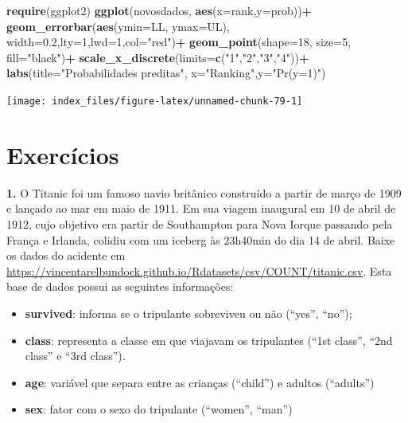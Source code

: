 \documentclass[12pt,brazil,oneside]{book}
\newenvironment{Shaded}{\begin{snugshade}}{\end{snugshade}}
\newcommand{\DataTypeTok}[1]{\textcolor[rgb]{0.13,0.29,0.53}{#1}}
\newcommand{\DecValTok}[1]{\textcolor[rgb]{0.00,0.00,0.81}{#1}}
\newcommand{\FloatTok}[1]{\textcolor[rgb]{0.00,0.00,0.81}{#1}}
\newcommand{\KeywordTok}[1]{\textcolor[rgb]{0.13,0.29,0.53}{\textbf{#1}}}
\newcommand{\NormalTok}[1]{#1}
\newcommand{\OperatorTok}[1]{\textcolor[rgb]{0.81,0.36,0.00}{\textbf{#1}}}
\newcommand{\StringTok}[1]{\textcolor[rgb]{0.31,0.60,0.02}{#1}}
\providecommand{\tightlist}{%
  \setlength{\itemsep}{0pt}\setlength{\parskip}{0pt}}
\begin{document}
\begin{Shaded}
\begin{Highlighting}[]
\KeywordTok{require}\NormalTok{(ggplot2)}
\KeywordTok{ggplot}\NormalTok{(novosdados, }\KeywordTok{aes}\NormalTok{(}\DataTypeTok{x=}\NormalTok{rank,}\DataTypeTok{y=}\NormalTok{prob))}\OperatorTok{+}
\StringTok{  }\KeywordTok{geom_errorbar}\NormalTok{(}\KeywordTok{aes}\NormalTok{(}\DataTypeTok{ymin=}\NormalTok{LL, }\DataTypeTok{ymax=}\NormalTok{UL), }\DataTypeTok{width=}\FloatTok{0.2}\NormalTok{,}\DataTypeTok{lty=}\DecValTok{1}\NormalTok{,}\DataTypeTok{lwd=}\DecValTok{1}\NormalTok{,}\DataTypeTok{col=}\StringTok{"red"}\NormalTok{)}\OperatorTok{+}
\StringTok{  }\KeywordTok{geom_point}\NormalTok{(}\DataTypeTok{shape=}\DecValTok{18}\NormalTok{, }\DataTypeTok{size=}\DecValTok{5}\NormalTok{, }\DataTypeTok{fill=}\StringTok{"black"}\NormalTok{)}\OperatorTok{+}
\StringTok{  }\KeywordTok{scale_x_discrete}\NormalTok{(}\DataTypeTok{limits=}\KeywordTok{c}\NormalTok{(}\StringTok{"1"}\NormalTok{,}\StringTok{"2"}\NormalTok{,}\StringTok{"3"}\NormalTok{,}\StringTok{"4"}\NormalTok{))}\OperatorTok{+}
\StringTok{  }\KeywordTok{labs}\NormalTok{(}\DataTypeTok{title=}\StringTok{"Probabilidades preditas"}\NormalTok{, }\DataTypeTok{x=}\StringTok{"Ranking"}\NormalTok{,}\DataTypeTok{y=}\StringTok{"Pr(y=1)"}\NormalTok{)}
\end{Highlighting}
\end{Shaded}

\begin{center}\texttt{[image: index\_files/figure-latex/unnamed-chunk-79-1]} \end{center}

\hypertarget{exercicios}{%
\section{Exercícios}\label{exercicios}}

\textbf{1.} O Titanic foi um famoso navio britânico construído a partir
de março de 1909 e lançado ao mar em maio de 1911. Em sua viagem
inaugural em 10 de abril de 1912, cujo objetivo era partir de
Southampton para Nova Iorque passando pela França e Irlanda, colidiu com
um iceberg às 23h40min do dia 14 de abril. Baixe os dados do acidente em
\url{https://vincentarelbundock.github.io/Rdatasets/csv/COUNT/titanic.csv}.
Esta base de dados possui as seguintes informações:

\begin{itemize}
\tightlist
\item
  \textbf{survived}: informa se o tripulante sobreviveu ou não (``yes'',
  ``no'');
\item
  \textbf{class}: representa a classe em que viajavam os tripulantes
  (``1st class'', ``2nd class'' e ``3rd class'').
\item
  \textbf{age}: variável que separa entre as crianças (``child'') e
  adultos (``adults'')
\item
  \textbf{sex}: fator com o sexo do tripulante (``women'', ``man'')
\end{itemize}
\end{document}
